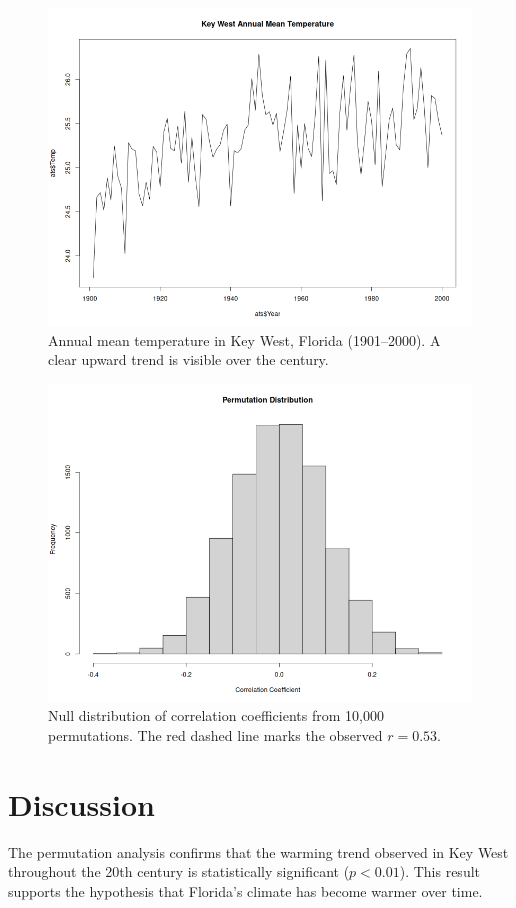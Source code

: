 \documentclass[a4paper,12pt]{article}
\begin{document}
\begin{figure}[H]
    \centering
    \includegraphics[width=0.85\linewidth]{Florida_TempTrend.png}
    \caption{Annual mean temperature in Key West, Florida (1901–2000). A clear upward trend is visible over the century.}
\end{figure}

\begin{figure}[H]
    \centering
    \includegraphics[width=0.85\linewidth]{Florida_PermutationDist.png}
    \caption{Null distribution of correlation coefficients from 10,000 permutations. The red dashed line marks the observed $r = 0.53$.}
\end{figure}

\section*{Discussion}
The permutation analysis confirms that the warming trend observed in Key West throughout the 20th century is statistically significant ($p < 0.01$). 
This result supports the hypothesis that Florida’s climate has become warmer over time.
\end{document}
